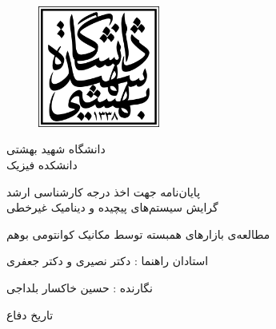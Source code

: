 \documentclass[a4paper,titlepage,12pt,fleqn,oneside]{report}
\begin{document}
    


~~~~~~~~~\newpage
\thispagestyle{empty}

\begin{figure}[h]
\begin{center}
\includegraphics[height=4cm]{sbu-logo-LimooGraphic.eps}
\end{center}
\end{figure}

\begin{center}
\LARGE{دانشگاه شهید بهشتی}\\
\LARGE{دانشکده فیزیک}\\
\end{center}
\vspace{5mm}
\begin{center}
پایان‌نامه جهت اخذ درجه کارشناسی ارشد\\
گرایش سیستم‌های پیچیده و دینامیک غیرخطی
\end{center}
\vspace{0.5cm}

\begin{center}
\Huge{مطالعه‌ی بازار‌های همبسته توسط مکانیک کوانتومی بوهم} 
\end{center}
\vspace{1cm}
\begin{center}
استادان راهنما : دکتر نصیری و دکتر جعفری
\end{center}
\vspace{1cm}
\begin{center}
نگارنده : حسین خاکسار بلداجی
\end{center}
\vspace{0.5cm}
\begin{center}
تاریخ دفاع
\end{center}
\newpage
%
\tableofcontents
\listoffigures
\end{document}
